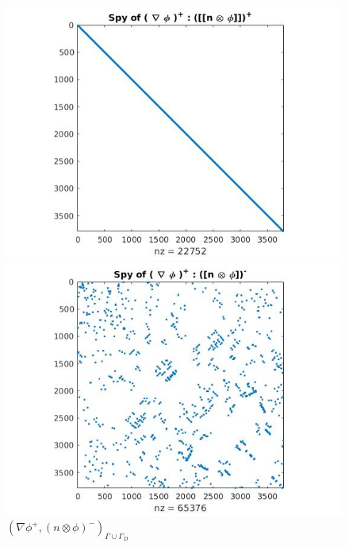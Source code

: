 \documentclass[a4paper]{book}
\begin{document}
\begin{figure}[H]
  \begin{minipage}[c]{0.5\textwidth}
    \includegraphics[width=\textwidth]{figure31.jpg}
\caption{$( \nabla \phi^+ ,(n \otimes \phi)^+)_{\Gamma \cup \Gamma_D}$}
  \label{fig:figure31}
  \end{minipage}\hfill
  \begin{minipage}[c]{0.5\textwidth}
    \includegraphics[width=\textwidth]{figure32.jpg}
  \caption{$( \nabla \phi^+ ,(n \otimes \phi)^-)_{\Gamma \cup \Gamma_D}$}
  \label{fig:figure32}
  \end{minipage}\hfill
    \begin{minipage}[c]{0.5\textwidth}

\end{minipage}
\end{figure}
\end{document}
